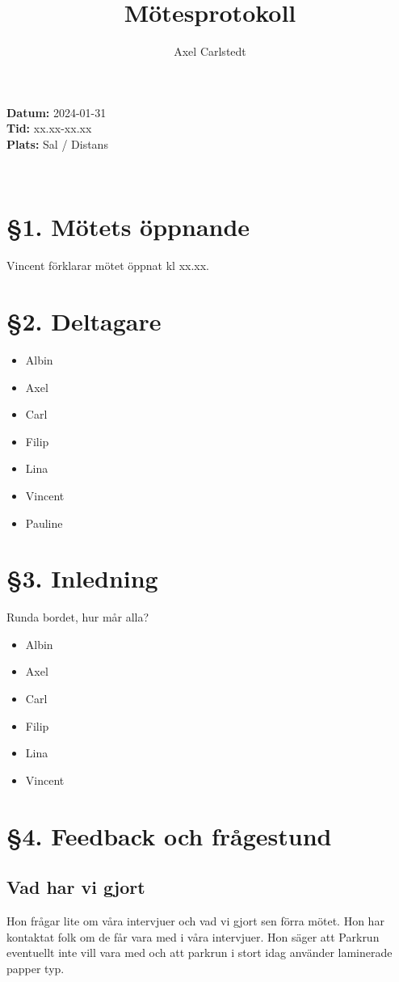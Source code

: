 \documentclass[a4paper, 11pt]{article}
\title{Mötesprotokoll}
\author{Axel Carlstedt}
\begin{document}
\pagestyle{style1}


\textbf{Datum:} 2024-01-31\\
\textbf{Tid:} xx.xx-xx.xx\\
\textbf{Plats:} Sal / Distans

\makebox[\linewidth]{\rule{\linewidth}{0.4pt}}\\

\section*{§1. Mötets öppnande}
Vincent förklarar mötet öppnat kl xx.xx.

\section*{§2. Deltagare}
\begin{itemize}
    \item Albin
    \item Axel
    \item Carl
    \item Filip
    \item Lina
    \item Vincent
    \item Pauline
\end{itemize}


\section*{§3. Inledning}
Runda bordet, hur mår alla?
\begin{itemize}
    \item Albin
    \item Axel
    \item Carl
    \item Filip
    \item Lina
    \item Vincent
    
\end{itemize}




\section*{§4. Feedback och frågestund}
    \subsection*{Vad har vi gjort}
    Hon frågar lite om våra intervjuer och vad vi gjort sen förra mötet.
    Hon har kontaktat folk om de får vara med i våra intervjuer.
    Hon säger att Parkrun eventuellt inte vill vara med och att parkrun i stort idag använder laminerade papper typ. 
    
\end{document}
